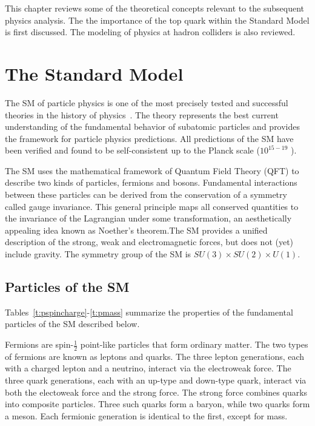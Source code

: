 

This chapter reviews some of the theoretical concepts relevant to the subsequent physics analysis. The the importance of the top quark within the Standard Model is first discussed. The modeling of physics at hadron colliders is also reviewed.

\section{The Standard Model}

The SM of particle physics is one of the most precisely tested and successful theories in the history of physics~\cite{peskin}. The theory represents the best current understanding of the fundamental behavior of subatomic particles and provides the framework for particle physics predictions. All predictions of the SM have been verified and found to be self-consistent up to the Planck scale ($10^{15-19}$ \gev). 

The SM uses the mathematical framework of Quantum Field Theory (QFT) to describe two kinds of particles, fermions and bosons. Fundamental interactions between these particles can be derived from the conservation of a symmetry called gauge invariance. This general principle maps all conserved quantities to the invariance of the Lagrangian under some transformation, an aesthetically appealing idea known as Noether's theorem.The SM provides a unified description of the strong, weak and electromagnetic forces, but does not (yet) include gravity. The symmetry group of the SM is $SU(3)\times SU(2)\times U(1)$.
\subsection{Particles of the SM}

Tables~\ref{t:pspincharge}-\ref{t:pmass} summarize the properties of the fundamental particles of the SM described below.

Fermions are spin-$\frac{1}{2}$ point-like particles that form ordinary matter. The two types of fermions are known as leptons and quarks. The three lepton generations, each with a charged lepton and a neutrino, interact via the electroweak force. The three quark generations, each with an up-type and down-type quark, interact via both the electoweak force and the strong force. The strong force combines quarks into composite particles. Three such quarks form a baryon, while two quarks form a meson. Each fermionic generation is identical to the first, except for mass. 

